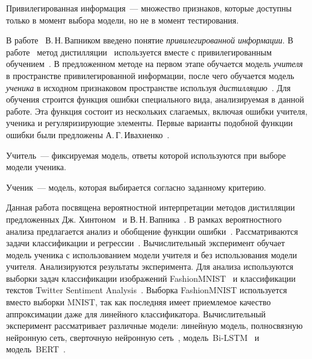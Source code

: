 \documentclass[12pt]{a&t}
\begin{document}
\begin{definition}
Привилегированная информация~--- множество признаков, которые доступны только в момент выбора модели, но не в момент тестирования.
\end{definition}
В работе~\cite{Vapnik2015} В.\,Н.\,Вапником введено понятие \textit{привилегированной информации}. В работе~\cite{Lopez2016} метод дистилляции~\cite{Hinton2015} используется вместе с привилегированным обучением~\cite{Vapnik2015}. В предложенном методе на первом этапе обучается модель \textit{учителя} в пространстве привилегированной информации, после чего обучается модель \textit{ученика} в исходном признаковом пространстве используя \textit{дистилляцию}~\cite{Hinton2015}. Для обучения строится функция ошибки специального вида, анализируемая в данной работе. Эта функция состоит из нескольких слагаемых, включая ошибки учителя, ученика и регуляризирующие элементы.  Первые варианты подобной функции ошибки были предложены А.\,Г.\,Ивахненко~\cite{Ivakhnenko1994}.
\begin{definition}
Учитель~--- фиксируемая модель, ответы которой используются при выборе модели ученика.
\end{definition}
\begin{definition}
Ученик~--- модель, которая выбирается согласно заданному критерию.
\end{definition}

Данная работа посвящена вероятностной интерпретации методов дистилляции предложенных Дж. Хинтоном~\cite{Hinton2015} и В.\,Н.\,Вапника~\cite{Vapnik2015}. В рамках вероятностного анализа предлагается анализ и обобщение функции ошибки~\cite{Hinton2015, Lopez2016}. Рассматриваются задачи классификации и регрессии~\cite{Ivakhnenko1994}. Вычислительный эксперимент обучает модель ученика с использованием модели учителя и без использования модели учителя. Анализируются результаты эксперимента. Для анализа используются  выборки задач классификации изображений FashionMNIST~\cite{fashionmnist} и классификации текстов Twitter Sentiment Analysis~\cite{twiter2013}. Выборка FashionMNIST используется вместо выборки MNIST, так как последняя имеет приемлемое качество аппроксимации даже для линейного классификатора. Вычислительный эксперимент рассматривает различные модели: линейную модель, полносвязную нейронную сеть, сверточную нейронную сеть~\cite{LeCun1989}, модель~Bi-LSTM~\cite{Schmidhuber1997} и модель~BERT~\cite{Devlin2018}.
\end{document}
